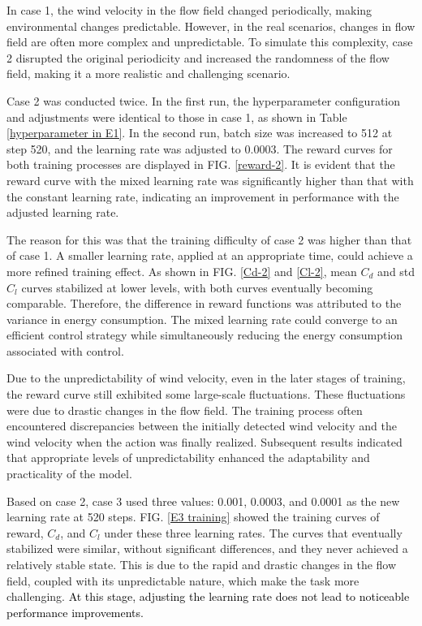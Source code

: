 \documentclass[%
 aip,
 amsmath,amssymb,
 reprint,%
]{revtex4-1}
\newcommand{\black}[1]{\textcolor{black}{#1}}
\begin{document}
In case 1, the wind velocity in the flow field changed periodically, making environmental changes predictable. However, in the real scenarios, changes in flow field are often more complex and unpredictable. To simulate this complexity, case 2 disrupted the original periodicity and increased the randomness of the flow field, making it a more realistic and challenging scenario.

Case 2 was conducted twice. In the first run, the hyperparameter configuration and adjustments were identical to those in case 1, as shown in Table \ref{hyperparameter in E1}. In the second run, batch size was increased to 512 at step 520, and the learning rate was adjusted to 0.0003. The reward curves for both training processes are displayed in FIG. \ref{reward-2}. It is evident that the reward curve with the mixed learning rate was significantly higher than that with the constant learning rate, indicating an improvement in performance with the adjusted learning rate.

The reason for this was that the training difficulty of case 2 was higher than that of case 1. A smaller learning rate, applied at an appropriate time, could achieve a more refined training effect. As shown in FIG. \ref{Cd-2} and \ref{Cl-2}, mean $C_d$ and std $C_l$ curves stabilized at lower levels, with both curves eventually becoming comparable. Therefore, the difference in reward functions was attributed to the variance in energy consumption. The mixed learning rate could converge to an efficient control strategy while simultaneously reducing the energy consumption associated with control.

Due to the unpredictability of wind velocity, even in the later stages of training, the reward curve still exhibited some large-scale fluctuations. These fluctuations were due to drastic changes in the flow field. The training process often encountered discrepancies between the initially detected wind velocity and the wind velocity when the action was finally realized. Subsequent results indicated that appropriate levels of unpredictability enhanced the adaptability and practicality of the model. 

Based on case 2, case 3 used three values: 0.001, 0.0003, and 0.0001 as the new learning rate at 520 steps. FIG. \ref{E3 training} showed the training curves of reward, $C_d$, and $C_l$ under these three learning rates. The curves that eventually stabilized were similar, without significant differences, and they never achieved a relatively stable state. This is due to the rapid and drastic changes in the flow field, coupled with its unpredictable nature, which make the task more challenging. \black{At this stage, adjusting the learning rate does not lead to noticeable performance improvements.}
\end{document}
